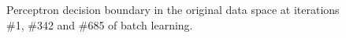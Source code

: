 \documentclass[a4]{article}
\begin{document}
\begin{figure}[h!]
\centering
\caption{Perceptron decision boundary in the original data space at iterations \#1, \#342 and \#685 of batch learning.}
\label{fig:origBA}
\end{figure}
\end{document}
